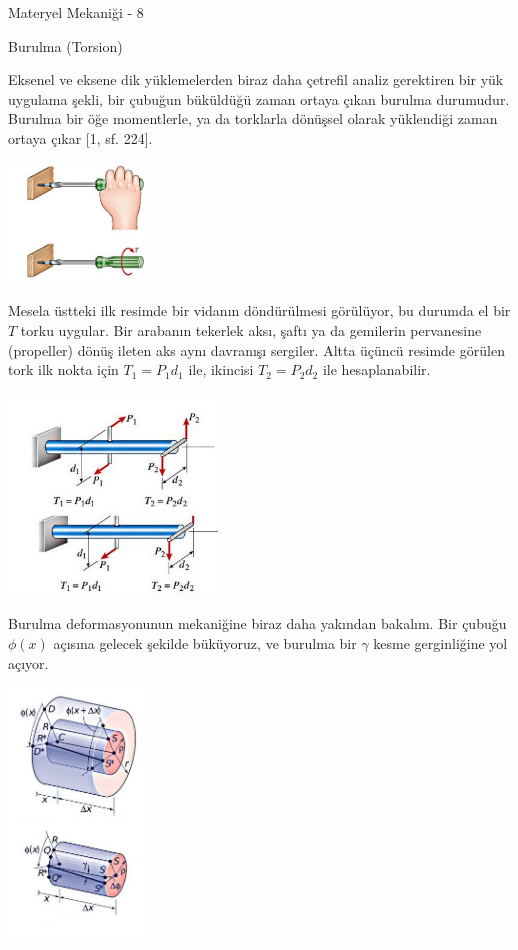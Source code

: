 \documentclass[12pt,fleqn]{article}\usepackage{../../common}
\begin{document}
Materyel Mekaniği - 8

Burulma (Torsion)

Eksenel ve eksene dik yüklemelerden biraz daha çetrefil analiz gerektiren bir
yük uygulama şekli, bir çubuğun büküldüğü zaman ortaya çıkan burulma durumudur.
Burulma bir öğe momentlerle, ya da torklarla dönüşsel olarak yüklendiği zaman
ortaya çıkar [1, sf. 224].

\includegraphics[width=10em]{phy_020_strs_06_01.jpg}

Mesela üstteki ilk resimde bir vidanın döndürülmesi görülüyor, bu durumda el bir
$T$ torku uygular. Bir arabanın tekerlek aksı, şaftı ya da gemilerin pervanesine
(propeller) dönüş ileten aks aynı davranışı sergiler.  Altta üçüncü resimde
görülen tork ilk nokta için $T_1 = P_1 d_1$ ile, ikincisi $T_2 = P_2 d_2$ ile
hesaplanabilir.

\includegraphics[width=15em]{phy_020_strs_06_02.jpg}

Burulma deformasyonunun mekaniğine biraz daha yakından bakalım. Bir çubuğu
$\phi(x)$ açısına gelecek şekilde büküyoruz, ve burulma bir $\gamma$ kesme
gerginliğine yol açıyor.

\includegraphics[width=10em]{phy_020_strs_06_03.jpg}
\end{document}
